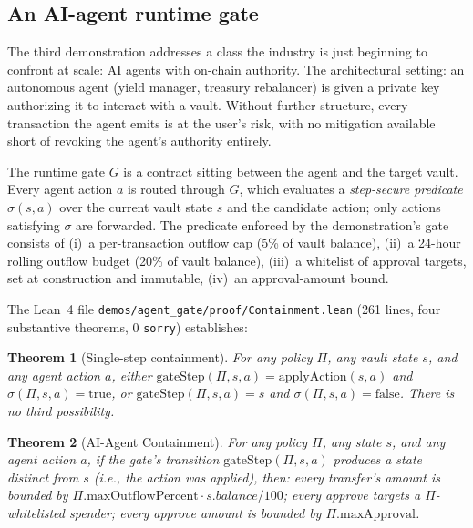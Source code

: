 \documentclass[11pt,a4paper]{article}
\newtheorem{theorem}{Theorem}
\begin{document}
\subsection{An AI-agent runtime gate}\label{ssec:demo-agent}

The third demonstration addresses a class the industry is just beginning to confront at scale: AI agents with on-chain authority. The architectural setting: an autonomous agent (yield manager, treasury rebalancer) is given a private key authorizing it to interact with a vault. Without further structure, every transaction the agent emits is at the user's risk, with no mitigation available short of revoking the agent's authority entirely.

The runtime gate $G$ is a contract sitting between the agent and the target vault. Every agent action $a$ is routed through $G$, which evaluates a \emph{step-secure predicate} $\sigma(s, a)$ over the current vault state $s$ and the candidate action; only actions satisfying $\sigma$ are forwarded. The predicate enforced by the demonstration's gate consists of (i)~a per-transaction outflow cap (5\% of vault balance), (ii)~a 24-hour rolling outflow budget (20\% of vault balance), (iii)~a whitelist of approval targets, set at construction and immutable, (iv)~an approval-amount bound.

The Lean~4 file \texttt{demos/agent\_gate/proof/Containment.lean} (261 lines, four substantive theorems, 0 \texttt{sorry}) establishes:

\begin{theorem}[Single-step containment]\label{thm:single-step-containment}
For any policy $\Pi$, any vault state $s$, and any agent action $a$, either $\mathrm{gateStep}(\Pi, s, a) = \mathrm{applyAction}(s, a)$ and $\sigma(\Pi, s, a) = \mathrm{true}$, or $\mathrm{gateStep}(\Pi, s, a) = s$ and $\sigma(\Pi, s, a) = \mathrm{false}$. There is no third possibility.
\end{theorem}

\begin{theorem}[AI-Agent Containment]\label{thm:ai-containment}
For any policy $\Pi$, any state $s$, and any agent action $a$, if the gate's transition $\mathrm{gateStep}(\Pi, s, a)$ produces a state distinct from $s$ (i.e., the action was applied), then: every transfer's amount is bounded by $\Pi.\mathrm{maxOutflowPercent} \cdot s.\mathit{balance} / 100$; every approve targets a $\Pi$-whitelisted spender; every approve amount is bounded by $\Pi.\mathrm{maxApproval}$.
\end{theorem}
\end{document}
